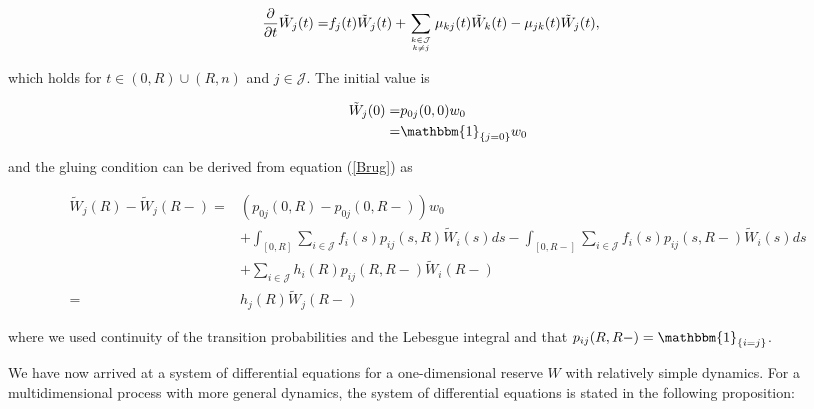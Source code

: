 \documentclass{article}
\newcommand{\1}[1]{\mathbbm{1}_{\left\lbrace #1 \right\rbrace}}
\theoremstyle{break}
\theoremstyle{remark}
\numberwithin{equation}{section}
\begin{document}
\begin{align*}
	\frac{\partial}{\partial t} \tilde{W}_j(t) =& f_j(t) \tilde{W}_j(t) + \sum_{k \in \mathcal{J} \atop k \neq j} \mu_{kj}(t) \tilde{W}_k(t) - \mu_{jk}(t) \tilde{W}_j(t),
\end{align*}

which holds for $t \in (0,R)\cup(R,n)$ and $j \in \mathcal{J}$. The initial value is

\begin{align*}
	\tilde{W}_j(0) =& p_{0j}(0,0) w_0 \\
	=& \1{j=0} w_0
\end{align*}

and the gluing condition can be derived from equation (\ref{Brug}) as

\begin{align*}
	\tilde{W}_j(R) - \tilde{W}_j(R-) =& \left(p_{0j}(0,R) - p_{0j}(0,R-)\right) w_0 \\
	&+ \int_{\left[ 0,R \right]} \sum_{i \in \mathcal{J}} f_{i}(s) p_{ij}(s,R) \tilde{W}_i(s) ds - \int_{\left[ 0,R- \right]} \sum_{i \in \mathcal{J}} f_{i}(s) p_{ij}(s,R-) \tilde{W}_i(s) ds \\
	&+ \sum_{i \in \mathcal{J}} h_{i}(R) p_{ij}(R,R-) \tilde{W}_i(R-) \\
	=& h_{j}(R) \tilde{W}_j(R-)
\end{align*}

where we used continuity of the transition probabilities and the Lebesgue integral and that $p_{ij}(R,R-) = \1{i=j}$.

We have now arrived at a system of differential equations for a one-dimensional reserve $W$ with relatively simple dynamics. For a multidimensional process with more general dynamics, the system of differential equations is stated in the following proposition:
\end{document}
